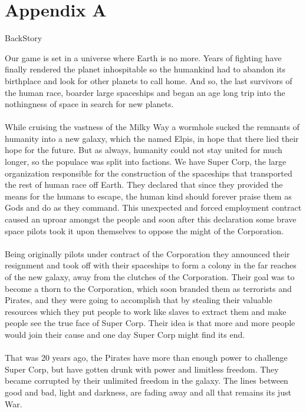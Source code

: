 \documentclass[11pt,a4paper]{article}
\begin{document}
\pagebreak
        \section{Appendix A}

        BackStory

        Our game is set in a universe where Earth is no more. Years of fighting have finally rendered the planet inhospitable so the humankind had to abandon its birthplace and look for other planets to call home. And so, the last survivors of the human race, boarder large spaceships and began an age long trip into the nothingness of space in search for new planets. \\\\
        While cruising the vastness of the Milky Way a wormhole sucked the remnants of humanity into a new galaxy, which the named Elpis, in hope that there lied their hope for the future. But as always, humanity could not stay united for much longer, so the populace was split into factions. We have Super Corp, the large organization responsible for the construction of the spaceships that transported the rest of human race off Earth. They declared that since they provided the means for the humans to escape, the human kind should forever praise them as Gods and do as they command. This unexpected and forced employment contract caused an uproar amongst the people and soon after this declaration some brave space pilots took it upon themselves to oppose the might of the Corporation. \\\\

        Being originally pilots under contract of the Corporation they announced their resignment and took off with their spaceships to form a colony in the far reaches of the new galaxy, away from the clutches of the Corporation. Their goal was to become a thorn to the Corporation, which soon branded them as terrorists and Pirates, and they were going to accomplish that by stealing their valuable resources which they put people to work like slaves to extract them and make people see the true face of Super Corp. Their idea is that more and more people would join their cause and one day Super Corp might find its end.
        \\ \\

        That was 20 years ago, the Pirates have more than enough power to challenge Super Corp, but have gotten drunk with power and limitless freedom. They became corrupted by their unlimited freedom in the galaxy. The lines between good and bad, light and darkness, are fading away and all that remains its just War.
\end{document}
